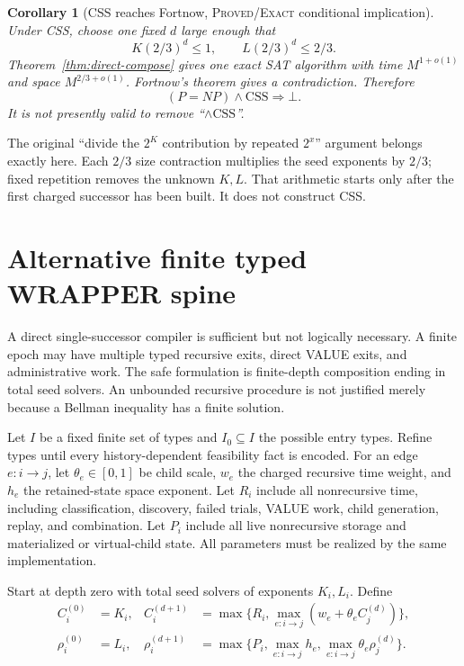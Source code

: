 \documentclass[11pt]{article}
\newtheorem{corollary}[theorem]{Corollary}
\newcommand{\Exact}{\textsc{Proved/Exact}}
\begin{document}
\begin{corollary}[CSS reaches Fortnow, \Exact{} conditional implication]
Under CSS, choose one fixed $d$ large enough that
\[
 K(2/3)^d\le1,
 \qquad
 L(2/3)^d\le2/3.
\]
Theorem~\ref{thm:direct-compose} gives one exact SAT algorithm with
time $M^{1+o(1)}$ and space $M^{2/3+o(1)}$.  Fortnow's theorem gives a
contradiction.  Therefore
\[
 (P=NP)\wedge\mathrm{CSS}\Longrightarrow\bot.
\]
It is not presently valid to remove ``$\wedge\mathrm{CSS}$''.
\end{corollary}

The original ``divide the $2^K$ contribution by repeated $2^x$'' argument
belongs exactly here.  Each $2/3$ size contraction multiplies the seed
exponents by $2/3$; fixed repetition removes the unknown $K,L$.  That
arithmetic starts only after the first charged successor has been built.  It
does not construct CSS.

\section{Alternative finite typed WRAPPER spine}

A direct single-successor compiler is sufficient but not logically
necessary.  A finite epoch may have multiple typed recursive exits, direct
VALUE exits, and administrative work.  The safe formulation is finite-depth
composition ending in total seed solvers.  An unbounded recursive procedure
is not justified merely because a Bellman inequality has a finite solution.

Let $I$ be a fixed finite set of types and $I_0\subseteq I$ the possible
entry types.  Refine types until every history-dependent feasibility fact is
encoded.  For an edge $e:i\to j$, let
$\theta_e\in[0,1]$ be child scale, $w_e$ the charged recursive time weight,
and $h_e$ the retained-state space exponent.  Let $R_i$ include all
nonrecursive time, including classification, discovery, failed trials,
VALUE work, child generation, replay, and combination.  Let $P_i$ include
all live nonrecursive storage and materialized or virtual-child state.  All
parameters must be realized by the same implementation.

Start at depth zero with total seed solvers of exponents $K_i,L_i$.  Define
\begin{align}
 C_i^{(0)}&=K_i,&
 C_i^{(d+1)}&=\max\{R_i,\max_{e:i\to j}(w_e+\theta_e C_j^{(d)})\},
 \label{eq:typed-time}\\
 \rho_i^{(0)}&=L_i,&
 \rho_i^{(d+1)}&=\max\{P_i,\max_{e:i\to j}h_e,
                         \max_{e:i\to j}\theta_e\rho_j^{(d)}\}.
 \label{eq:typed-space}
\end{align}
\end{document}

